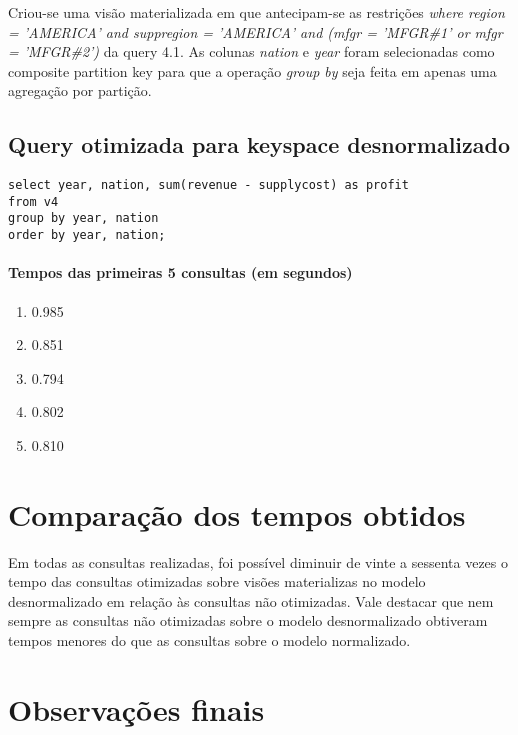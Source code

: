 \documentclass[12pt]{article}
\begin{document}
Criou-se uma visão materializada em que antecipam-se as restrições \emph{where region = 'AMERICA' and suppregion = 'AMERICA' and (mfgr = 'MFGR\#1' or mfgr = 'MFGR\#2')} da query 4.1. As colunas \emph{nation} e \emph{year} foram selecionadas como composite partition key para que a operação \emph{group by} seja feita em apenas uma agregação por partição.

\subsection{Query otimizada para keyspace desnormalizado}

\begin{lstlisting}
select year, nation, sum(revenue - supplycost) as profit 
from v4
group by year, nation
order by year, nation;
\end{lstlisting}

\paragraph{Tempos das primeiras 5 consultas (em segundos)}
\begin{enumerate}
\item 0.985
\item 0.851
\item 0.794
\item 0.802
\item 0.810
\end{enumerate}

\section{Comparação dos tempos obtidos}

Em todas as consultas realizadas, foi possível diminuir de vinte a sessenta vezes o tempo das consultas otimizadas sobre visões materializas no modelo desnormalizado em relação às consultas não otimizadas. Vale destacar que nem sempre as consultas não otimizadas sobre o modelo desnormalizado obtiveram tempos menores do que as consultas sobre o modelo normalizado.

\section{Observações finais}
\end{document}
